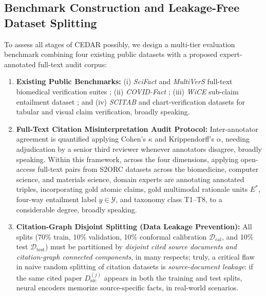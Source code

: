 \documentclass[sigconf]{acmart}
\begin{document}
\subsection{Benchmark Construction and Leakage-Free Dataset Splitting}
To assess all stages of CEDAR possibly, we design a multi-tier evaluation benchmark combining four existing public datasets with a proposed expert-annotated full-text audit corpus:
\begin{enumerate}
\item \textbf{Existing Public Benchmarks:} (i) \emph{SciFact} \cite{wadden2020fact} and \emph{MultiVerS} full-text biomedical verification suites \cite{wadden2022multivers}; (ii) \emph{COVID-Fact} \cite{saakyan2021covidfact}; (iii) \emph{WiCE} sub-claim entailment dataset \cite{kamoi2023wice}; and (iv) \emph{SCITAB} \cite{lu2023scitab} and chart-verification datasets \cite{akhtar2023reading} for tabular and visual claim verification, broadly speaking.
\item \textbf{Full-Text Citation Misinterpretation Audit Protocol:} Inter-annotator agreement is quantified applying Cohen's $\kappa$ and Krippendorff's $\alpha$, needing adjudication by a senior third reviewer whenever annotators disagree, broadly speaking. Within this framework, across the four dimensions, applying open-access full-text pairs from S2ORC datasets \cite{lo2020s2orc} across the biomedicine, computer science, and materials science, domain experts are annotating annotated triples, incorporating gold atomic claims, gold multimodal rationale units $E^*$, four-way entailment label $y \in \mathcal{Y}$, and taxonomy class T1--T8, to a considerable degree, broadly speaking.
\item \textbf{Citation-Graph Disjoint Splitting (Data Leakage Prevention):} All splits (70\% train, 10\% validation, 10\% conformal calibration $\mathcal{D}_{\text{cal}}$, and 10\% test $\mathcal{D}_{\text{test}}$) must be partitioned by \emph{disjoint cited source documents and citation-graph connected components}, in many respects; truly, a critical flaw in naive random splitting of citation datasets is \emph{source-document leakage}: if the same cited paper $D_{\text{src}}^{(j)}$ appears in both the training and test splits, neural encoders memorize source-specific facts, in real-world scenarios.
\end{enumerate}
\end{document}
